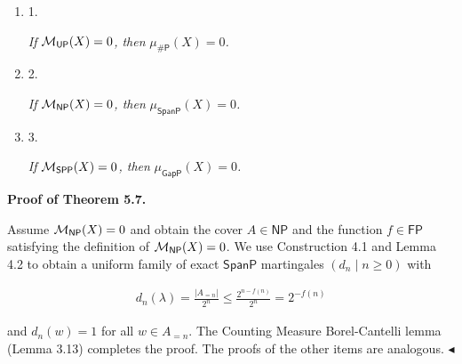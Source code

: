 \begin{enumerate}


\item[] 
1. 


\emph{If }${{\cal M}_{\mathsf{UP}}}(X)=0$\emph{, then }$\mu_{\mathsf{\#}\mathsf{P}}(X)=0$\emph{.}\par





\item[] 
2. 


\emph{If }${{\cal M}_{\mathsf{NP}}}(X)=0$\emph{, then }$\mu_{\mathsf{SpanP}}(X)=0$\emph{.}\par





\item[] 
3. 


\emph{If }${{\cal M}_{\mathsf{SPP}}}(X)=0$\emph{, then }$\mu_{\mathsf{GapP}}(X)=0$\emph{.}\par





\end{enumerate}







\par\medskip\noindent\textbf{Proof of Theorem 5.7.}\par




Assume ${{\cal M}_{\mathsf{NP}}}(X)=0$ and obtain the cover $A\in\mathsf{NP}$ and the function $f\in\mathsf{FP}$ satisfying the definition of ${{\cal M}_{\mathsf{NP}}}(X)=0$.
We use Construction 4.1 and Lemma 4.2 to obtain a uniform family of exact $\mathsf{SpanP}$ martingales $(d_{n}\mid n\geq 0)$ with\par


\[\begin{gathered}
d_{n}(\lambda)=\frac{|A_{=n}|}{2^{n}}\leq\frac{2^{n-f(n)}}{2^{n}}=2^{-f(n)}
\end{gathered}\]


and
$d_{n}(w)=1$ for all $w\in A_{=n}$.
The Counting Measure Borel-Cantelli lemma (Lemma 3.13) completes the proof. The proofs of the other items are analogous.
$\blacktriangleleft$\par






